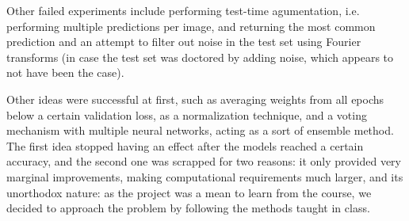 \documentclass[11pt]{article}
\begin{document}
\begin{multicols}{2}
      Other failed experiments include performing test-time agumentation, i.e. 
      performing multiple predictions per image, and returning the most common prediction 
      and an attempt to filter out noise in the test set using Fourier transforms (in case
      the test set was doctored by adding noise, which appears to not have been the case).

      Other ideas were successful at first, such as averaging weights from all epochs 
      below a certain validation loss, as a normalization technique, and a voting mechanism 
      with multiple neural networks, acting as a sort of ensemble method. The first idea
      stopped having an effect after the models reached a certain accuracy, and the second
      one was scrapped for two reasons: it only provided very marginal improvements, 
      making computational requirements much larger, and its unorthodox nature: as the 
      project was a mean to learn from the course, we decided to approach the problem by 
      following the methods taught in class.




\end{multicols}
\end{document}
